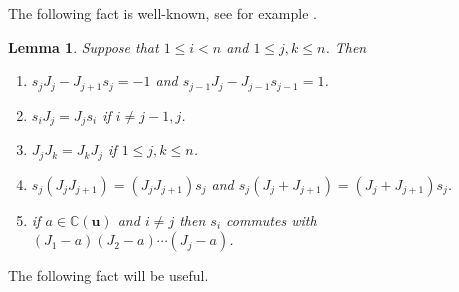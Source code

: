 \documentclass[a4paper, oneside]{amsart}
\numberwithin{equation}{section}
\newtheorem{lemma}[equation]{Lemma}
\theoremstyle{definition}
\theoremstyle{remark}
\begin{document}
The following fact is well-known, see for example \cite[2.3]{Z2}.
\begin{lemma}\label{Lem:si-Jj}Suppose that $1\le i<n$ and $1\le j, k\le n$. Then
\begin{enumerate}\setlength{\itemsep}{1\jot}
\item  $s_jJ_j-J_{j+1}s_j=-1$ and $s_{j-1}J_j-J_{j-1}s_{j-1}=1$.
 \item $s_iJ_j=J_js_i$ if $i\neq j-1, j$.
 \item $J_jJ_k=J_kJ_j$ if $1\le j, k\le n$.
 \item $s_j(J_jJ_{j+1})=(J_jJ_{j+1})s_j$ and $s_j(J_j+J_{j+1})=(J_{j}+J_{j+1})s_j$.
 \item if $a\in \mathbb{C}(\boldsymbol{u})$ and $i\neq j$ then $s_i$ commutes with $(J_1-a)(J_2-a)\cdots(J_j-a)$.
 \end{enumerate}
  \end{lemma}

The following fact will be useful.
\end{document}

